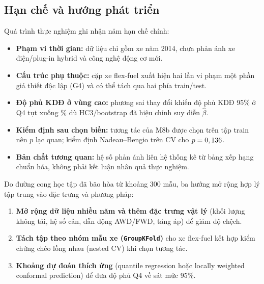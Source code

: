 \subsection{Hạn chế và hướng phát triển}
Quá trình thực nghiệm ghi nhận năm hạn chế chính:
\begin{itemize}
  \item \textbf{Phạm vi thời gian:} dữ liệu chỉ gồm xe năm 2014, chưa phản ánh xe điện/plug-in hybrid và công nghệ động cơ mới.
  \item \textbf{Cấu trúc phụ thuộc:} \nPairs{} cặp xe flex-fuel xuất hiện hai lần vi phạm một phần giả thiết độc lập (G4) và có thể tách qua hai phía train/test.
  \item \textbf{Độ phủ KDĐ ở vùng cao:} phương sai thay đổi khiến độ phủ KDĐ 95\% ở Q4 tụt xuống \piCoverQFour\% dù HC3/bootstrap đã hiệu chỉnh suy diễn $\hat\beta$.
  \item \textbf{Kiểm định sau chọn biến:} tương tác của M8b được chọn trên tập train nên $p$ lạc quan; kiểm định Nadeau--Bengio trên CV cho $p = 0,136$.
  \item \textbf{Bản chất tương quan:} hệ số phản ánh liên hệ thống kê từ bảng xếp hạng chuẩn hóa, không phải kết luận nhân quả thực nghiệm.
\end{itemize}

Do đường cong học tập đã bão hòa từ khoảng 300 mẫu, ba hướng mở rộng hợp lý tập trung vào đặc trưng và phương pháp:
\begin{enumerate}
  \item \textbf{Mở rộng dữ liệu nhiều năm và thêm đặc trưng vật lý} (khối lượng không tải, hệ số cản, dẫn động AWD/FWD, tăng áp) để giảm độ chệch.
  \item \textbf{Tách tập theo nhóm mẫu xe (\texttt{GroupKFold})} cho xe flex-fuel kết hợp kiểm chứng chéo lồng nhau (nested CV) khi chọn tương tác.
  \item \textbf{Khoảng dự đoán thích ứng} (quantile regression hoặc locally weighted conformal prediction) để đưa độ phủ Q4 về sát mức 95\%.
\end{enumerate}
